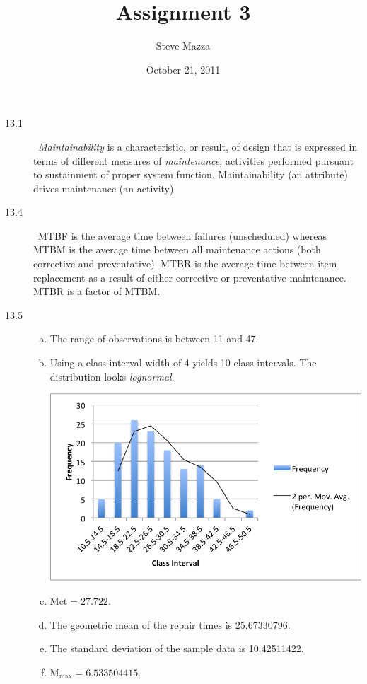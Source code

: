 \documentclass[letterpaper,10pt]{article}
\title{Assignment 3}
\author{Steve Mazza}
\date{October 21, 2011}
\newcommand{\Mct}{\overline{\mbox{M}}\mbox{ct}}
\begin{document}
\maketitle

\begin{description}
\item[13.1]\ \emph{Maintainability} is a characteristic, or result, of design that is expressed in terms of different measures of \emph{maintenance,} activities performed pursuant to sustainment of proper system function.  Maintainability (an attribute) drives maintenance (an activity).

\item[13.4]\ MTBF is the average time between failures (unscheduled) whereas MTBM is the average time between all maintenance actions (both corrective and preventative).  MTBR is the average time between item replacement as a result of either corrective or preventative maintenance.  MTBR is a factor of MTBM.

\item[13.5]
\begin{enumerate}[(a)]
\item The range of observations is between 11 and 47.
\item Using a class interval width of 4 yields 10 class intervals.  The distribution looks \emph{lognormal}.
\begin{center}
\includegraphics[scale=0.75]{assignment3mazzaImage0.png}
\end{center}
\item $\Mct = 27.7\overline{22}$.
\item The geometric mean of the repair times is 25.67330796.
\item The standard deviation of the sample data is 10.42511422.
\item M$_{\mbox{max}} =6.533504415$.
\end{enumerate}


\end{description}
\end{document}
